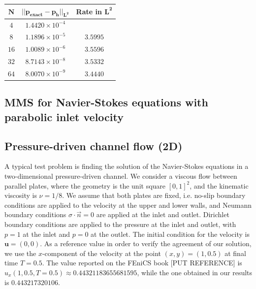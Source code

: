 \documentclass[11pt,a4paper,titlepage]{report}
\begin{document}
\begin{center}
\begin{tabular}{| c | c | c |}
\hline
$\mathbf{N}$ & $\mathbf{|| p_{exact} - p_h ||_{L^2}}$ & \textbf{Rate in } $  \mathbf{L^2}$  \\
\hline
$ 4 $ & $1.4420  \times 10^{-4} $ & \\
\hline
$ 8 $ & $ 1.1896  \times 10^{-5} $ & $3.5995$ \\
\hline
$ 16 $ & $ 1.0089  \times 10^{-6} $ & $3.5596$ \\
\hline
$ 32 $ & $  8.7143 \times 10^{-8} $ & $3.5332$ \\
\hline
$ 64 $ & $ 8.0070 \times 10^{-9} $ & $3.4440$ \\
\hline
\end{tabular}
\end{center}


\subsection{MMS for Navier-Stokes equations with parabolic inlet velocity}

\subsection{Pressure-driven channel flow (2D)}


A typical test problem is finding the solution of the Navier-Stokes equations in a two-dimensional pressure-driven channel. We consider a viscous flow between parallel plates, where the geometry is the unit square $[0,1]^2$, and the kinematic viscosity is $\nu = 1/8$. We assume that both plates are fixed, i.e. no-slip boundary conditions are applied to the velocity at the upper and lower walls, and Neumann boundary conditions $\sigma \cdot \vec{n} = 0$ are applied at the inlet and outlet. Dirichlet boundary conditions are applied to the pressure at the inlet and outlet, with $p = 1$ at the inlet and $p = 0$ at the outlet. The initial condition for the velocity is $\mathbf{u} = (0,0)$. As a reference value in order to verify the agreement of our solution, we use the $x$-component of the velocity at the point $(x, y) = (1, 0.5)$ at final time $T = 0.5 $. The value reported on the FEniCS book [PUT REFERENCE] is $u_x(1, 0.5, T=0.5) \approx 0.44321183655681595$, while the one obtained in our results is $0.443217320106$.
\end{document}
